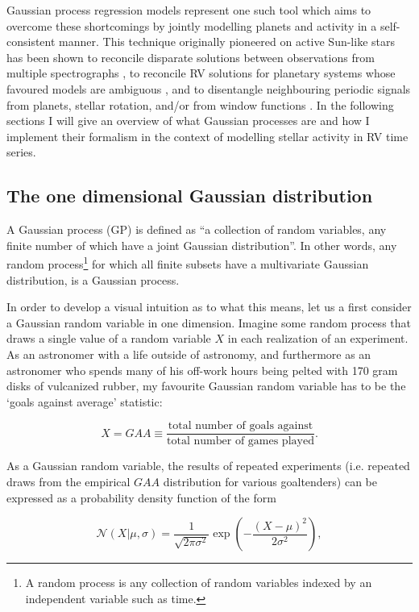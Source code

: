 Gaussian process regression models represent one such tool which aims to overcome
these shortcomings by jointly modelling planets and activity in a self-consistent
manner. This technique originally pioneered on active Sun-like stars
\citep{haywood14,rajpaul15} has been shown to reconcile disparate solutions
between observations from multiple spectrographs \citep{rajpaul17,cloutier18b},
to reconcile RV solutions for planetary systems whose favoured models are
ambiguous \citep{rajpaul17,cloutier18b}, and to disentangle neighbouring periodic
signals from planets, stellar rotation, and/or from window functions
\citep{rajpaul16,cloutier17b}.
In the following sections I will give an overview
of what Gaussian processes are and how I implement their formalism in the context
of modelling stellar activity in RV time series.

\subsection{The one dimensional Gaussian distribution}
A Gaussian process (GP) is defined as ``a collection of random variables, any
finite number of which have a joint Gaussian distribution''. In other words,
any random process\footnote{A random process is any collection of random
  variables indexed by an independent variable such as time.} for which all
finite subsets have a multivariate Gaussian distribution, is a Gaussian process.

In order to develop a visual intuition as to what this means, let us a first
consider a Gaussian random variable in one dimension. Imagine some random
process that draws a single value of a random variable $X$ in each realization of
an experiment. As an astronomer with a life
outside of astronomy, and furthermore as an astronomer who spends many of his
off-work hours being pelted with 170 gram disks of vulcanized rubber, my favourite
Gaussian random variable has to be the `goals against average' statistic:

\begin{equation}
  X = GAA \equiv \frac{\text{total number of goals against}}{\text{total number of games played}}.
\end{equation}

\noindent As a Gaussian random variable, the results of repeated experiments (i.e.
repeated draws from the empirical $GAA$ distribution for various goaltenders) can
be expressed as a probability density function of the form

\begin{equation}
  \mathcal{N}(X|\mu,\sigma) = \frac{1}{\sqrt{2\pi \sigma^2}} \exp{\left(
    -\frac{(X-\mu)^2}{2\sigma^2} \right)},
  \label{eq:gauss}
\end{equation}

